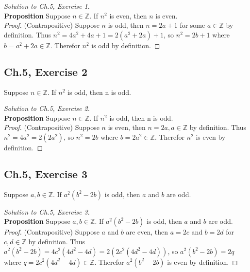 \documentclass[12pt]{amsart}
\numberwithin{equation}{section}
\theoremstyle{definition}
\theoremstyle{remark}
\begin{document}
\begin{proof}[Solution to Ch.5,  Exercise 1]
\ \\
\textbf{Proposition} Suppose $ n \in \mathbb{Z} $. If $ n^2 $ is even, then $ n $ is even. \\
\textit{Proof.} (Contrapositive) Suppose $ n $ is odd, then $ n = 2a + 1 $ for some $ a \in \mathbb{Z} $ by definition. Thus $ n^2 = 4a^2 + 4a + 1 = 2(a^2 + 2a) + 1 $, so $ n^2 = 2b + 1 $ where $ b = a^2 + 2a \in \mathbb{Z} $. Therefor $ n^2 $ is odd by definition.

\end{proof}




\subsection*{Ch.5,  Exercise 2}  Suppose $ n \in \mathbb{Z} $. If $ n^2 $ is odd, then n is odd.  


\begin{proof}[Solution to Ch.5,  Exercise 2]
\ \\
\textbf{Proposition} Suppose $ n \in \mathbb{Z} $. If $ n^2 $ is odd, then n is odd.  \\
\textit{Proof.} (Contrapositive) Suppose $ n $ is even, then $ n = 2a, a \in \mathbb{Z} $ by definition. Thus $ n^2 = 4a^2 = 2(2a^2) $, so $ n^2 = 2b $ where $ b = 2a^2 \in \mathbb{Z} $. Therefor $ n^2 $ is even by definition.

\end{proof}




\subsection*{Ch.5,  Exercise 3}  Suppose $ a,b \in \mathbb{Z} $. If $ a^2(b^2-2b) $ is odd, then $ a $ and $ b $ are odd.



\begin{proof}[Solution to Ch.5,  Exercise 3]
\ \\
\textbf{Proposition}  Suppose $ a,b \in \mathbb{Z} $. If $ a^2(b^2-2b) $ is odd, then $ a $ and $ b $ are odd. \\
\textit{Proof.} (Contrapositive) Suppose $ a $ and $ b $ are even, then $ a = 2c $ and $ b = 2d $ for $ c, d \in \mathbb{Z} $ by definition. Thus $ a^2 (b^2 - 2b) = 4c^2 (4d^2 - 4d) = 2 (2c^2 (4d^2 - 4d) ) $, so $ a^2 (b^2  - 2b) = 2q $ where $ q = 2c^2 (4d^2 - 4d) \in \mathbb{Z} $. Therefor $ a^2  (b^2 - 2b) $ is even by definition.

\end{proof}
\end{document}
